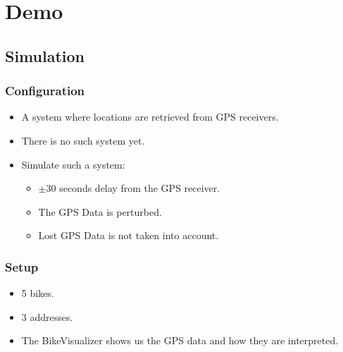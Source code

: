 \section{Demo}
\subsection{Simulation}

\begin{frame}
\frametitle{Configuration}
\begin{itemize}
\item A system where locations are retrieved from GPS receivers.
\item There is no such system yet.
\item Simulate such a system:
\begin{itemize}
\item $\pm$30 seconds delay from the GPS receiver.
\item The GPS Data is perturbed.
\item Lost GPS Data is not taken into account.
\end{itemize}
\end{itemize}
\end{frame}

\begin{frame}
\frametitle{Setup}
\begin{itemize}
\item 5 bikes.
\item 3 addresses.
\item The BikeVisualizer shows us the GPS data and how they are interpreted.
\end{itemize}
\end{frame}


